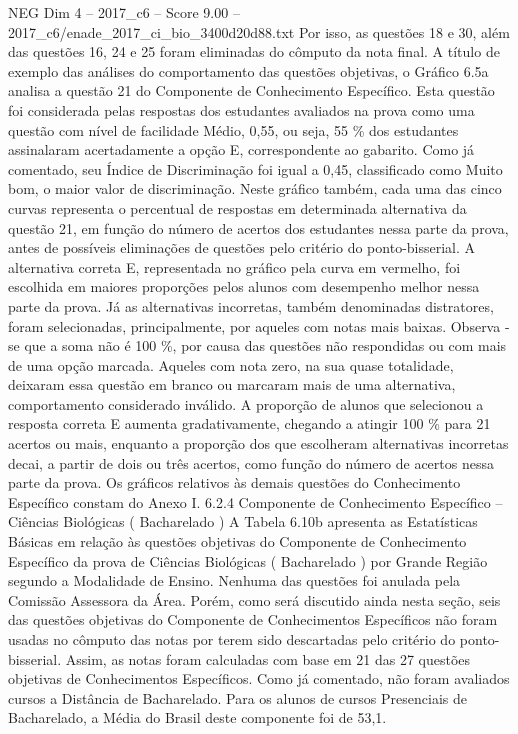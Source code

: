 \begin{textsample}{NEG Dim 4 – 2017\_c6 – Score 9.00 – 2017\_c6/enade\_2017\_ci\_bio\_3400d20d88.txt}
Por isso, as questões 18 e 30, além das questões 16, 24 e 25 foram eliminadas do cômputo da nota final.
A título de exemplo das análises do comportamento das questões objetivas, o Gráfico 6.5a analisa a questão 21 do Componente de Conhecimento Específico.
Esta questão foi considerada pelas respostas dos estudantes avaliados na prova como uma questão com nível de facilidade Médio, 0,55, ou seja, 55 \% dos estudantes assinalaram acertadamente a opção E, correspondente ao gabarito.
Como já comentado, seu Índice de Discriminação foi igual a 0,45, classificado como Muito bom, o maior valor de discriminação.
Neste gráfico também, cada uma das cinco curvas representa o percentual de respostas em determinada alternativa da questão 21, em função do número de acertos dos estudantes nessa parte da prova, antes de possíveis eliminações de questões pelo critério do ponto-bisserial.
A alternativa correta E, representada no gráfico pela curva em vermelho, foi escolhida em maiores proporções pelos alunos com desempenho melhor nessa parte da prova.
Já as alternativas incorretas, também denominadas distratores, foram selecionadas, principalmente, por aqueles com notas mais baixas.
Observa -se que a soma não é 100 \%, por causa das questões não respondidas ou com mais de uma opção marcada.
Aqueles com nota zero, na sua quase totalidade, deixaram essa questão em branco ou marcaram mais de uma alternativa, comportamento considerado inválido.
A proporção de alunos que selecionou a resposta correta E aumenta gradativamente, chegando a atingir 100 \% para 21 acertos ou mais, enquanto a proporção dos que escolheram alternativas incorretas decai, a partir de dois ou três acertos, como função do número de acertos nessa parte da prova.
Os gráficos relativos às demais questões do Conhecimento Específico constam do Anexo I. 6.2.4 Componente de Conhecimento Específico – Ciências Biológicas ( Bacharelado ) A Tabela 6.10b apresenta as Estatísticas Básicas em relação às questões objetivas do Componente de Conhecimento Específico da prova de Ciências Biológicas ( Bacharelado ) por Grande Região segundo a Modalidade de Ensino.
Nenhuma das questões foi anulada pela Comissão Assessora da Área.
Porém, como será discutido ainda nesta seção, seis das questões objetivas do Componente de Conhecimentos Específicos não foram usadas no cômputo das notas por terem sido descartadas pelo critério do ponto-bisserial.
Assim, as notas foram calculadas com base em 21 das 27 questões objetivas de Conhecimentos Específicos.
Como já comentado, não foram avaliados cursos a Distância de Bacharelado.
Para os alunos de cursos Presenciais de Bacharelado, a Média do Brasil deste componente foi de 53,1.

\end{textsample}
